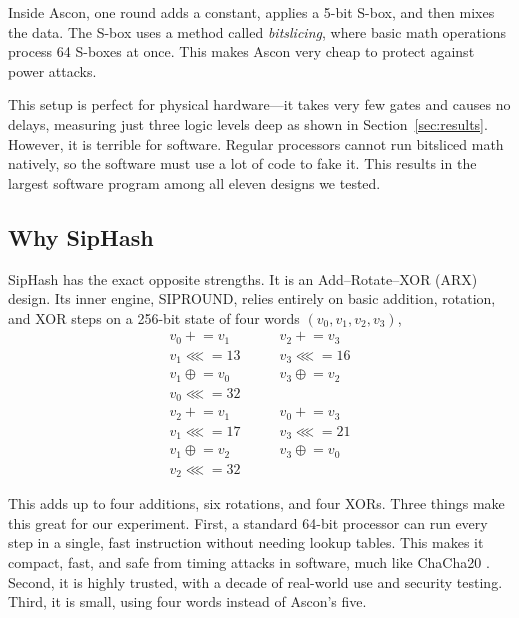 Inside Ascon, one round adds a constant, applies a 5-bit S-box, and then mixes the data. The S-box uses a method called \emph{bitslicing}, where basic math operations process 64 S-boxes at once. This makes Ascon very cheap to protect against power attacks.

This setup is perfect for physical hardware---it takes very few gates and causes no delays, measuring just three logic levels deep as shown in Section~\ref{sec:results}. However, it is terrible for software. Regular processors cannot run bitsliced math natively, so the software must use a lot of code to fake it. This results in the largest software program among all eleven designs we tested.

\subsection{Why SipHash}

SipHash \cite{siphash} has the exact opposite strengths. It is an Add--Rotate--XOR (ARX) design. Its inner engine, SIPROUND, relies entirely on basic addition, rotation, and XOR steps on a 256-bit state of four words $(v_0,v_1,v_2,v_3)$,
\begin{equation}
\begin{array}{ll}
v_0 \mathrel{+}= v_1 & v_2 \mathrel{+}= v_3\\
v_1 \mathrel{\lll}= 13 \qquad & v_3 \mathrel{\lll}= 16\\
v_1 \mathrel{\oplus}= v_0 & v_3 \mathrel{\oplus}= v_2\\
v_0 \mathrel{\lll}= 32 & \\[2pt]
v_2 \mathrel{+}= v_1 & v_0 \mathrel{+}= v_3\\
v_1 \mathrel{\lll}= 17 & v_3 \mathrel{\lll}= 21\\
v_1 \mathrel{\oplus}= v_2 & v_3 \mathrel{\oplus}= v_0\\
v_2 \mathrel{\lll}= 32 &
\end{array}
\label{eq:sipround}
\end{equation}

This adds up to four additions, six rotations, and four XORs. Three things make this great for our experiment. First, a standard 64-bit processor can run every step in a single, fast instruction without needing lookup tables. This makes it compact, fast, and safe from timing attacks in software, much like ChaCha20 \cite{chacha}. Second, it is highly trusted, with a decade of real-world use and security testing. Third, it is small, using four words instead of Ascon's five.

